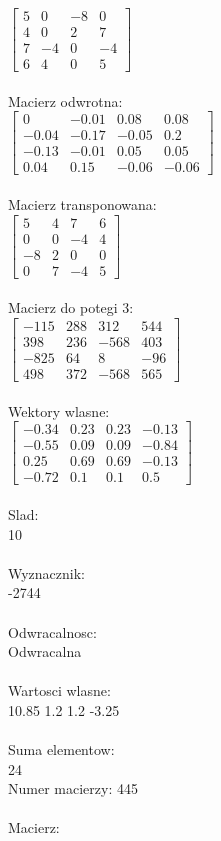 \documentclass[a4paper,12pt]{article}
\begin{document}
$\begin{bmatrix} 5&0&-8&0\\4&0&2&7\\7&-4&0&-4\\6&4&0&5 \end{bmatrix}$
\\
\\
Macierz odwrotna:\\

$\begin{bmatrix} 0&-0.01&0.08&0.08\\-0.04&-0.17&-0.05&0.2\\-0.13&-0.01&0.05&0.05\\0.04&0.15&-0.06&-0.06 \end{bmatrix}$
\\
\\
Macierz transponowana:\\

$\begin{bmatrix} 5&4&7&6\\0&0&-4&4\\-8&2&0&0\\0&7&-4&5 \end{bmatrix}$
\\
\\
Macierz do potegi 3:\\

$\begin{bmatrix} -115&288&312&544\\398&236&-568&403\\-825&64&8&-96\\498&372&-568&565 \end{bmatrix}$
\\
\\
Wektory wlasne:\\

$\begin{bmatrix} -0.34&0.23&0.23&-0.13\\-0.55&0.09&0.09&-0.84\\0.25&0.69&0.69&-0.13\\-0.72&0.1&0.1&0.5 \end{bmatrix}$
\\
\\
Slad:\\
10
\\
\\
Wyznacznik:\\
-2744
\\
\\
Odwracalnosc:\\
Odwracalna
\\
\\
Wartosci wlasne:\\
10.85 1.2 1.2 -3.25
\\
\\
Suma elementow:\\
24
\\
\newpage
Numer macierzy:
445
\\
\\
Macierz:\\
\end{document}
